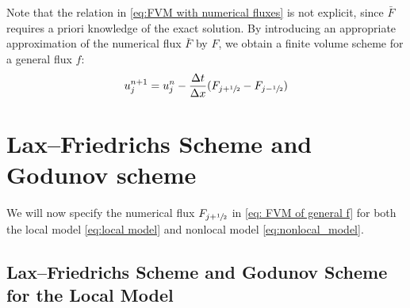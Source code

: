 Note that the relation in \eqref{eq:FVM with numerical fluxes} is not explicit, since $\bar{F}$ requires a priori knowledge of the exact solution. By introducing an appropriate approximation of the numerical flux $\bar{F}$ by $F$, we obtain a finite volume scheme for a general flux $f$:
\begin{equation}\label{eq: FVM of general f}
    \begin{split}
        u_{j}^{n+1} = u_{j}^{n} - \frac{\Delta t}{\Delta x} (F_{j+\sfrac{1}{2}} - F_{j-\sfrac{1}{2}})
    \end{split}
\end{equation}

\section{Lax--Friedrichs Scheme and Godunov scheme}
We will now specify the numerical flux $F_{j+\sfrac{1}{2}}$ in \eqref{eq: FVM of general f} for both the local model \eqref{eq:local model} and nonlocal model \eqref{eq:nonlocal_model}.

\subsection{Lax--Friedrichs Scheme and Godunov Scheme for the Local Model}

